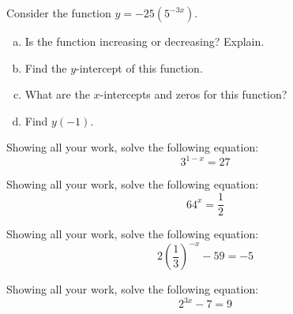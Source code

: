 \documentclass[11pt,letterpaper]{article}
\begin{document}
\newpage



 Consider the function $y= -25 (5^{-3x})$.
        \begin{enumerate}[(a)]
        \item Is the function increasing or decreasing? Explain.
        \item Find the $y$-intercept of this function.
        \item What are the $x$-intercepts and zeros for this function?
        \item Find $y(-1)$. 
        \end{enumerate} 



\newpage



 Showing all your work, solve the following equation:
	\[
	3^{1 - x}= 27
	\]



\newpage



 Showing all your work, solve the following equation:
	\[
	64^x= \dfrac{1}{2}
	\]



\newpage



 Showing all your work, solve the following equation:
	\[
	2\left( \dfrac{1}{3} \right)^{-x} - 59= -5
	\]



\newpage



 Showing all your work, solve the following equation:
	\[
	2^{3x} - 7= 9
	\]
\end{document}
